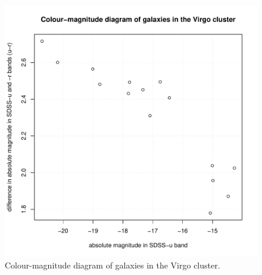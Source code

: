 \documentclass[11pt,a4paper,twoside]{article}
\begin{document}
\begin{figure}[!ht]
\centering
\includegraphics[width=1\linewidth]{pic/cmd_Virgo.pdf}
\caption{Colour-magnitude diagram of galaxies in the Virgo cluster.}
\label{fig:cmd_Virgo}
\end{figure}
\end{document}
